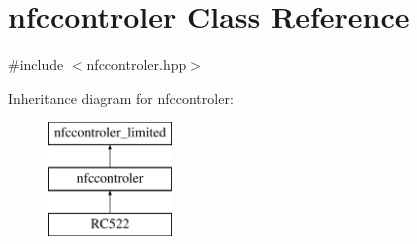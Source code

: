 \hypertarget{classnfccontroler}{}\section{nfccontroler Class Reference}
\label{classnfccontroler}


{\ttfamily \#include $<$nfccontroler.\+hpp$>$}

Inheritance diagram for nfccontroler\+:\begin{figure}[H]
\begin{center}
\leavevmode
\includegraphics[height=3.000000cm]{classnfccontroler}
\end{center}
\end{figure}
